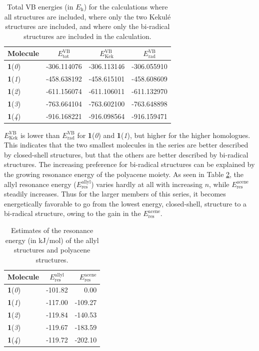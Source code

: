 \begin{table}[b]
\caption{Total VB energies (in $E_\mathrm{h}$) for the calculations where all structures are included, where only the two Kekul\'e structures are included, and where only the bi-radical structures are included in the calculation.}
\begin{center}
\begin{tabular}{l c c c}
\hline
Molecule&
$E^\mathrm{VB}_\mathrm{tot}$&
$E^\mathrm{VB}_\mathrm{Kek}$&
$E^\mathrm{VB}_\mathrm{rad}$\\
\hline
\textbf{1}(\textit{0}) & -306.114076 & -306.113146 & -306.055910 \\
\textbf{1}(\textit{1}) & -458.638192 & -458.615101 & -458.608609 \\
\textbf{1}(\textit{2}) & -611.156074 & -611.106011 & -611.132970 \\
\textbf{1}(\textit{3}) & -763.664104 & -763.602100 & -763.648898 \\
\textbf{1}(\textit{4}) & -916.168221 & -916.098564 & -916.159471 \\
\hline
\end{tabular}
\end{center}
\label{ch7.tab04}
\end{table}
$E^\mathrm{VB}_\mathrm{Kek}$ is lower than $E^\mathrm{VB}_\mathrm{rad}$ for \textbf{1}(\textit{0}) and \textbf{1}(\textit{1}), but higher for the higher homologues. This indicates that the two smallest molecules in the series are better described by closed-shell structures, but that the others are better described by bi-radical structures. The increasing preference for bi-radical structures can be explained by the growing resonance energy of the polyacene moiety. As seen in Table \ref{ch7.tab05}, the allyl resonance energy ($E^\mathrm{allyl}_\mathrm{res}$) varies hardly at all with increasing $n$, while $E^\mathrm{acene}_\mathrm{res}$ steadily increases.
Thus for the larger members of this series, it becomes energetically favorable to go from the lowest energy, closed-shell, structure to a bi-radical structure, owing to the gain in the $E^\mathrm{acene}_\mathrm{res}$.
\begin{table}[ht]
\caption{Estimates of the resonance energy (in kJ/mol) of the allyl structures and polyacene structures.}
\begin{center}
\begin{tabular}{l c r}
\hline
Molecule &
$E^\mathrm{allyl}_\mathrm{res}$&
$E^\mathrm{acene}_\mathrm{res}$\\
\hline
\textbf{1}(\textit{0}) & -101.82 &  0.00\\
\textbf{1}(\textit{1}) & -117.00 & -109.27\\
\textbf{1}(\textit{2}) & -119.84 & -140.53\\
\textbf{1}(\textit{3}) & -119.67 & -183.59\\
\textbf{1}(\textit{4}) & -119.72 & -202.10\\
\hline
\end{tabular}
\end{center}
\label{ch7.tab05}
\end{table}

